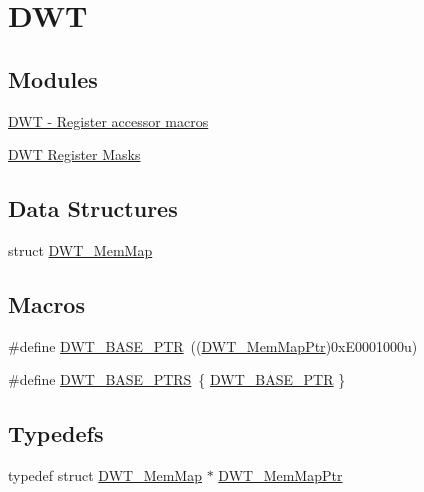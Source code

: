\hypertarget{group___d_w_t___peripheral}{}\section{D\+WT}
\label{group___d_w_t___peripheral}
\subsection*{Modules}
\begin{DoxyCompactItemize}
\item 
\hyperlink{group___d_w_t___register___accessor___macros}{D\+W\+T -\/ Register accessor macros}
\item 
\hyperlink{group___d_w_t___register___masks}{D\+W\+T Register Masks}
\end{DoxyCompactItemize}
\subsection*{Data Structures}
\begin{DoxyCompactItemize}
\item 
struct \hyperlink{struct_d_w_t___mem_map}{D\+W\+T\+\_\+\+Mem\+Map}
\end{DoxyCompactItemize}
\subsection*{Macros}
\begin{DoxyCompactItemize}
\item 
\#define \hyperlink{group___d_w_t___peripheral_ga3b46dfb2ea7946c6938028d879c82cb1}{D\+W\+T\+\_\+\+B\+A\+S\+E\+\_\+\+P\+TR}~((\hyperlink{group___d_w_t___peripheral_ga8a09a1b28d871c18ae8c69f67af6d573}{D\+W\+T\+\_\+\+Mem\+Map\+Ptr})0x\+E0001000u)
\item 
\#define \hyperlink{group___d_w_t___peripheral_ga606d55285f2df3c4bb43272ec842b475}{D\+W\+T\+\_\+\+B\+A\+S\+E\+\_\+\+P\+T\+RS}~\{ \hyperlink{group___d_w_t___peripheral_ga3b46dfb2ea7946c6938028d879c82cb1}{D\+W\+T\+\_\+\+B\+A\+S\+E\+\_\+\+P\+TR} \}
\end{DoxyCompactItemize}
\subsection*{Typedefs}
\begin{DoxyCompactItemize}
\item 
typedef struct \hyperlink{struct_d_w_t___mem_map}{D\+W\+T\+\_\+\+Mem\+Map} $\ast$ \hyperlink{group___d_w_t___peripheral_ga8a09a1b28d871c18ae8c69f67af6d573}{D\+W\+T\+\_\+\+Mem\+Map\+Ptr}
\end{DoxyCompactItemize}


